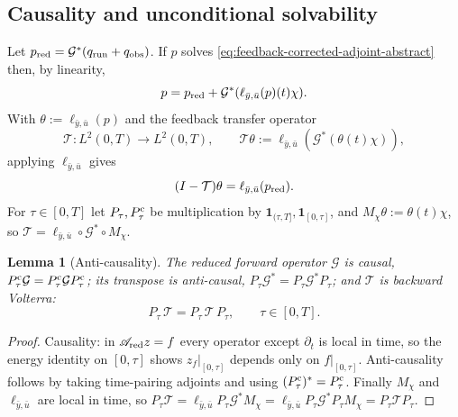 \documentclass[pdflatex,sn-mathphys-num]{sn-jnl}
\theoremstyle{plain}
\newtheorem{lemma}[theorem]{Lemma}
\theoremstyle{definition}
\theoremstyle{remark}
\begin{document}
\subsection{Causality and unconditional solvability}
\label{subsec:causality-quasinilpotent}
Let $p_{\rm red}=\mathcal G^*(q_{\rm run}+q_{\rm obs})$. If $p$ solves
\eqref{eq:feedback-corrected-adjoint-abstract} then, by linearity,
\begin{equation}
\label{eq:p-corrected-preliminary}
p=p_{\rm red}+\mathcal G^*(\ell_{\bar y,\bar u}(p)(t)\chi).
\end{equation}
With $\theta:=\ell_{\bar y,\bar u}(p)$ and the feedback transfer operator
\[
\mathcal T:L^2(0,T)\to L^2(0,T),
\qquad
\mathcal T\theta:=\ell_{\bar y,\bar u}(\mathcal G^*(\theta(t)\chi)),
\]
applying $\ell_{\bar y,\bar u}$ gives
\begin{equation}
\label{eq:I-minus-T}
(I-\mathcal T)\theta=\ell_{\bar y,\bar u}(p_{\rm red}).
\end{equation}
For $\tau\in[0,T]$ let $P_\tau,P_\tau^{\rm c}$ be multiplication by
$\mathbf1_{(\tau,T]},\mathbf1_{[0,\tau]}$, and $M_\chi\theta:=\theta(t)\chi$,
so $\mathcal T=\ell_{\bar y,\bar u}\circ\mathcal G^*\circ M_\chi$.

\begin{lemma}[Anti-causality]
\label{lem:anticausality}
The reduced forward operator $\mathcal G$ is causal,
$P_\tau^{\rm c}\mathcal G=P_\tau^{\rm c}\mathcal G P_\tau^{\rm c}$; its
transpose is anti-causal,
$P_\tau\mathcal G^*=P_\tau\mathcal G^*P_\tau$; and $\mathcal T$ is backward
Volterra:
\begin{equation}
\label{eq:T-anticausality}
P_\tau\,\mathcal T=P_\tau\,\mathcal T\,P_\tau,
\qquad\tau\in[0,T].
\end{equation}
\end{lemma}

\begin{proof}
Causality: in $\mathscr A_{\rm red}z=f$ every operator except $\partial_t$ is
local in time, so the energy identity on $[0,\tau]$ shows $z_f|_{[0,\tau]}$
depends only on $f|_{[0,\tau]}$. Anti-causality follows by taking
time-pairing adjoints and using $(P_\tau^{\rm c})^*=P_\tau^{\rm c}$. Finally
$M_\chi$ and $\ell_{\bar y,\bar u}$ are local in time, so
$P_\tau\mathcal T=\ell_{\bar y,\bar u}P_\tau\mathcal G^*M_\chi
=\ell_{\bar y,\bar u}P_\tau\mathcal G^*P_\tau M_\chi=P_\tau\mathcal T P_\tau$.
\end{proof}
\end{document}
